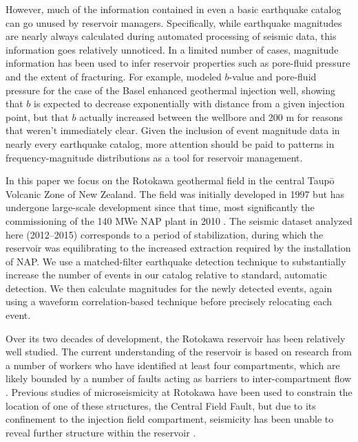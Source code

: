 However, much of the information contained in even a basic earthquake catalog can go unused by reservoir managers. Specifically, while earthquake magnitudes are nearly always calculated during automated processing of seismic data, this information goes relatively unnoticed. In a limited number of cases, magnitude information has been used to infer reservoir properties such as pore-fluid pressure and the extent of fracturing. For example, \citet{Bachmann_2012} modeled $b$-value and pore-fluid pressure for the case of the Basel enhanced geothermal injection well, showing that $b$ is expected to decrease exponentially with distance from a given injection point, but that $b$ actually increased between the wellbore and 200 m for reasons that weren't immediately clear. Given the inclusion of event magnitude data in nearly every earthquake catalog, more attention should be paid to patterns in frequency-magnitude distributions as a tool for reservoir management.

In this paper we focus on the Rotokawa geothermal field in the central Taup\={o} Volcanic Zone of New Zealand. The field was initially developed in 1997 but has undergone large-scale development since that time, most significantly the commissioning of the 140 \acrfull{MWe} \acrfull{NAP} plant in 2010 \citep{McNamara_2016}. The seismic dataset analyzed here (2012--2015) corresponds to a period of stabilization, during which the reservoir was equilibrating to the increased extraction required by the installation of NAP. We use a matched-filter earthquake detection technique to substantially increase the number of events in our catalog relative to standard, automatic detection. We then calculate magnitudes for the newly detected events, again using a waveform correlation-based technique before precisely relocating each event. 

Over its two decades of development, the Rotokawa reservoir has been relatively well studied. The current understanding of the reservoir is based on research from a number of workers who have identified at least four compartments, which are likely bounded by a number of faults acting as barriers to inter-compartment flow \citep{Sewell_2015,Addison_2017stanford,wallis2013}. Previous studies of microseismicity at Rotokawa have been used to constrain the location of one of these structures, the Central Field Fault, but due to its confinement to the injection field compartment, seismicity has been unable to reveal further structure within the reservoir \citep{Sherburn_2015,Sewell_2015WGC}.

